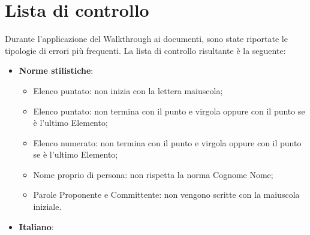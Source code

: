 \appendix



\section{Lista di controllo}
\label{sec:ListaControllo}
Durante l'applicazione del Walkthrough ai documenti, sono state riportate le tipologie
di errori più frequenti. La lista di controllo risultante è la seguente:
\begin{itemize}

\item \textbf{Norme stilistiche}:
\begin{itemize}
\item Elenco puntato: non inizia con la lettera maiuscola;
\item Elenco puntato: non termina con il punto e virgola oppure con il punto se è
l’ultimo Elemento;
\item Elenco numerato: non termina con il punto e virgola oppure con il punto se
è l’ultimo Elemento;
\item Nome proprio di persona: non rispetta la norma Cognome Nome;
\item Parole Proponente e Committente: non vengono scritte con la maiuscola
iniziale.
\end{itemize}
\item \textbf{Italiano}:
\begin{itemize}


\end{itemize}
\end{itemize}
